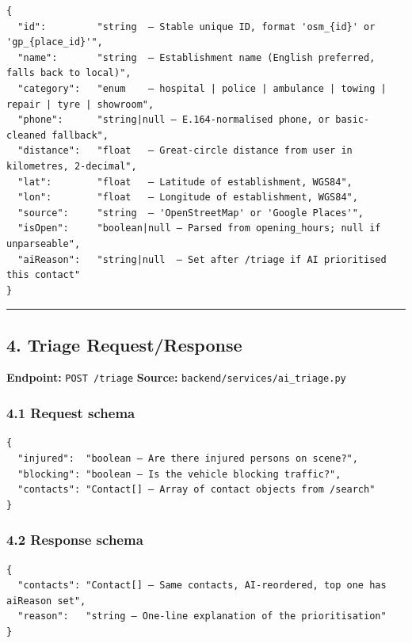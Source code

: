 \begin{verbatim}
{
  "id":         "string  — Stable unique ID, format 'osm_{id}' or 'gp_{place_id}'",
  "name":       "string  — Establishment name (English preferred, falls back to local)",
  "category":   "enum    — hospital | police | ambulance | towing | repair | tyre | showroom",
  "phone":      "string|null — E.164-normalised phone, or basic-cleaned fallback",
  "distance":   "float   — Great-circle distance from user in kilometres, 2-decimal",
  "lat":        "float   — Latitude of establishment, WGS84",
  "lon":        "float   — Longitude of establishment, WGS84",
  "source":     "string  — 'OpenStreetMap' or 'Google Places'",
  "isOpen":     "boolean|null — Parsed from opening_hours; null if unparseable",
  "aiReason":   "string|null  — Set after /triage if AI prioritised this contact"
}
\end{verbatim}

\begin{center}\rule{0.5\linewidth}{0.5pt}\end{center}

\hypertarget{triage-requestresponse}{%
\subsection{4. Triage Request/Response}\label{triage-requestresponse}}

\textbf{Endpoint:} \texttt{POST\ /triage} \textbf{Source:}
\texttt{backend/services/ai\_triage.py}

\hypertarget{request-schema}{%
\subsubsection{4.1 Request schema}\label{request-schema}}

\begin{verbatim}
{
  "injured":  "boolean — Are there injured persons on scene?",
  "blocking": "boolean — Is the vehicle blocking traffic?",
  "contacts": "Contact[] — Array of contact objects from /search"
}
\end{verbatim}

\hypertarget{response-schema}{%
\subsubsection{4.2 Response schema}\label{response-schema}}

\begin{verbatim}
{
  "contacts": "Contact[] — Same contacts, AI-reordered, top one has aiReason set",
  "reason":   "string — One-line explanation of the prioritisation"
}
\end{verbatim}

